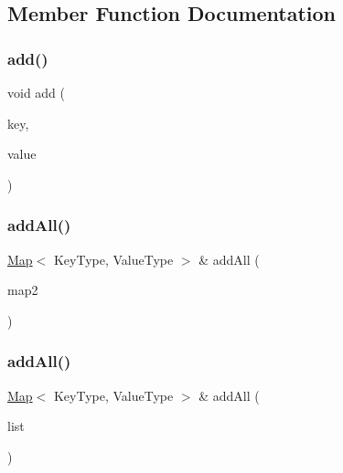 \subsection{Member Function Documentation}
\mbox{\label{classMap_a9129d6095063e7e14d85c627d35086a5}} 
\subsubsection{\texorpdfstring{add()}{add()}}
{\footnotesize\ttfamily void add (\begin{DoxyParamCaption}\item[{const Key\+Type \&}]{key,  }\item[{const Value\+Type \&}]{value }\end{DoxyParamCaption})}

\mbox{\label{classMap_a44f4dae7b5abf1bd265cd5e8cb6cf47b}} 
\subsubsection{\texorpdfstring{add\+All()}{addAll()}\hspace{0.1cm}{\footnotesize\ttfamily [1/2]}}
{\footnotesize\ttfamily \mbox{\hyperlink{classMap}{Map}}$<$ Key\+Type, Value\+Type $>$ \& add\+All (\begin{DoxyParamCaption}\item[{const \mbox{\hyperlink{classMap}{Map}}$<$ Key\+Type, Value\+Type $>$ \&}]{map2 }\end{DoxyParamCaption})}

\mbox{\label{classMap_a6a9d926265bac6843977955112057120}} 
\subsubsection{\texorpdfstring{add\+All()}{addAll()}\hspace{0.1cm}{\footnotesize\ttfamily [2/2]}}
{\footnotesize\ttfamily \mbox{\hyperlink{classMap}{Map}}$<$ Key\+Type, Value\+Type $>$ \& add\+All (\begin{DoxyParamCaption}\item[{std\+::initializer\+\_\+list$<$ std\+::pair$<$ Key\+Type, Value\+Type $>$ $>$}]{list }\end{DoxyParamCaption})}

